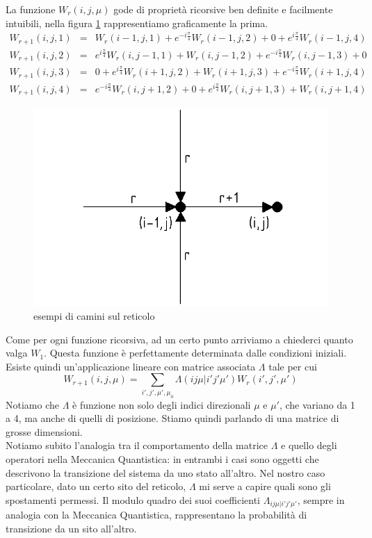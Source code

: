 \documentclass[11pt]{article}
\begin{document}
La funzione $W_r(i,j,\mu)$ gode di proprietà ricorsive ben definite e facilmente intuibili, nella figura \ref{v7} rappresentiamo graficamente la prima.
$$
\begin{array}{lcl} 
W_{r+1}(i,j,1) & = & W_r(i-1,j,1)+e^{-i\frac{\pi}{4}}W_r(i-1,j,2)+0+e^{i\frac{\pi}{4}}W_r(i-1,j,4) \\
W_{r+1}(i,j,2) & = & e^{i\frac{\pi}{4}}W_r(i,j-1,1)+W_r(i,j-1,2)+e^{-i\frac{\pi}{4}}W_r(i,j-1,3)+0 \\
W_{r+1}(i,j,3) & = & 0+e^{i\frac{\pi}{4}}W_r(i+1,j,2)+W_r(i+1,j,3)+e^{-i\frac{\pi}{4}}W_r(i+1,j,4) \\
W_{r+1}(i,j,4) & = & e^{-i\frac{\pi}{4}}W_r(i,j+1,2)+0+e^{i\frac{\pi}{4}}W_r(i,j+1,3)+W_r(i,j+1,4)
\end{array} 
$$
\begin{figure}[h]
\centering
\includegraphics[width=0.8\columnwidth]{v7}
\caption{esempi di camini sul reticolo}
\label{v7}
\end{figure}
Come per ogni funzione ricorsiva, ad un certo punto arriviamo a chiederci quanto valga $W_1$. Questa funzione è perfettamente determinata dalle condizioni iniziali. \\
Esiste quindi un'applicazione lineare con matrice associata $\Lambda$ tale per cui
\begin{equation}
W_{r+1}(i,j,\mu)=\sum_{i',j',\mu',\mu_0}\Lambda(ij\mu|i'j'\mu')W_{r}(i',j',\mu')
\end{equation}
Notiamo che $\Lambda$ è funzione non solo degli indici direzionali $\mu$ e $\mu'$, che variano da 1 a 4, ma anche di quelli di posizione. Stiamo quindi parlando di una matrice di grosse dimensioni.\\
Notiamo subito l'analogia tra il comportamento della matrice $\Lambda$ e quello degli operatori nella Meccanica Quantistica: in entrambi i casi sono oggetti che descrivono la transizione del sistema da uno stato all'altro. Nel nostro caso particolare, dato un certo sito del reticolo, $\Lambda$ mi serve a capire quali sono gli spostamenti permessi. Il modulo quadro dei suoi coefficienti $\Lambda_{ij \mu | i'j' \mu'}$, sempre in analogia con la Meccanica Quantistica, rappresentano la probabilità di transizione da un sito all'altro.\\
\end{document}
